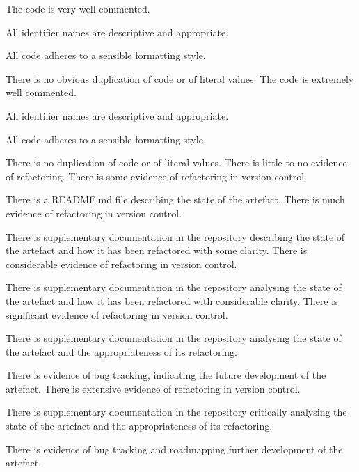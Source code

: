 \begin{markingrubric}
        \grade The code is very well commented.
            \par All identifier names are descriptive and appropriate.
            \par All code adheres to a sensible formatting style.
             \par There is no obvious duplication of code or of literal values.
        \grade The code is extremely well commented.
            \par All identifier names are descriptive and appropriate.
            \par All code adheres to a sensible formatting style.
            \par There is no duplication of code or of literal values.
%
        \grade \fail There is little to no evidence of refactoring. 
        \grade There is some evidence of refactoring in version control. 
            \par There is a README.md file describing the state of the artefact.  
        \grade There is much evidence of refactoring in version control.
            \par There is supplementary documentation in the repository describing the state of the artefact and how it has been refactored with some clarity.  
        \grade There is considerable evidence of refactoring in version control.  
            \par There is supplementary documentation in the repository analysing the state of the artefact and how it has been refactored with considerable clarity.  
        \grade There is significant evidence of refactoring in version control.  
            \par There is supplementary documentation in the repository analysing the state of the artefact and the appropriateness of its refactoring.  
            \par There is evidence of bug tracking, indicating the future development of the artefact.  
        \grade There is extensive evidence of refactoring in version control. 
            \par There is supplementary documentation in the repository critically analysing the state of the artefact and the appropriateness of its refactoring.  
            \par There is evidence of bug tracking and roadmapping further development of the artefact.  
%
\end{markingrubric}

